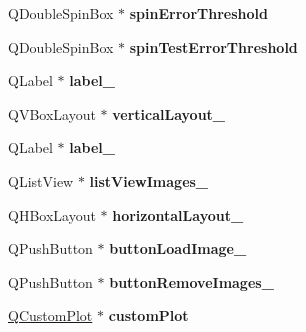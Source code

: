 \begin{DoxyCompactItemize}
\item 
Q\+Double\+Spin\+Box $\ast$ {\bfseries spin\+Error\+Threshold}\hypertarget{class_ui___main_form_a74372beb7a694b93137785dad096b088}{}\label{class_ui___main_form_a74372beb7a694b93137785dad096b088}

\item 
Q\+Double\+Spin\+Box $\ast$ {\bfseries spin\+Test\+Error\+Threshold}\hypertarget{class_ui___main_form_af4862593ad4aade3be24b4ac943bc623}{}\label{class_ui___main_form_af4862593ad4aade3be24b4ac943bc623}

\item 
Q\+Label $\ast$ {\bfseries label\+\_}\hypertarget{class_ui___main_form_aefc59b74be6f0b0964746835d6286c27}{}\label{class_ui___main_form_aefc59b74be6f0b0964746835d6286c27}

\item 
Q\+V\+Box\+Layout $\ast$ {\bfseries vertical\+Layout\+\_}\hypertarget{class_ui___main_form_afba7d98c1fbe5cf9dbae40a99c1311de}{}\label{class_ui___main_form_afba7d98c1fbe5cf9dbae40a99c1311de}

\item 
Q\+Label $\ast$ {\bfseries label\+\_}\hypertarget{class_ui___main_form_a16472fe236f22f3ac06d043c48cb3748}{}\label{class_ui___main_form_a16472fe236f22f3ac06d043c48cb3748}

\item 
Q\+List\+View $\ast$ {\bfseries list\+View\+Images\+\_}\hypertarget{class_ui___main_form_a7ed6411f977363db705cf46ccfbadf85}{}\label{class_ui___main_form_a7ed6411f977363db705cf46ccfbadf85}

\item 
Q\+H\+Box\+Layout $\ast$ {\bfseries horizontal\+Layout\+\_}\hypertarget{class_ui___main_form_a0d85789d088246a9f59542cfe5d555a4}{}\label{class_ui___main_form_a0d85789d088246a9f59542cfe5d555a4}

\item 
Q\+Push\+Button $\ast$ {\bfseries button\+Load\+Image\+\_}\hypertarget{class_ui___main_form_a98d8bc05e8037c2a38ec1d7917e9f343}{}\label{class_ui___main_form_a98d8bc05e8037c2a38ec1d7917e9f343}

\item 
Q\+Push\+Button $\ast$ {\bfseries button\+Remove\+Images\+\_}\hypertarget{class_ui___main_form_a3fdeb0352ad96cb8b4f8338b73805d5b}{}\label{class_ui___main_form_a3fdeb0352ad96cb8b4f8338b73805d5b}

\item 
\hyperlink{class_q_custom_plot}{Q\+Custom\+Plot} $\ast$ {\bfseries custom\+Plot}\hypertarget{class_ui___main_form_ad4fc56a37f73bc72645e13c0cebfc1df}{}\label{class_ui___main_form_ad4fc56a37f73bc72645e13c0cebfc1df}


\end{DoxyCompactItemize}
